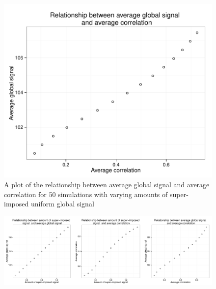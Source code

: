 \documentclass[a4paper]{article}\usepackage[]{graphicx}\usepackage[]{color}
\makeatletter
\def\maxwidth{ %
  \ifdim\Gin@nat@width>\linewidth
    \linewidth
  \else
    \Gin@nat@width
  \fi
}
\newenvironment{knitrout}{}{} %
\makeatother
\begin{document}
\begin{knitrout}
\color{fgcolor}\begin{figure}[]


{\centering \includegraphics[width=\maxwidth]{GSFigs/GSavgGSavgCOR} 

}

\caption[A plot of the relationship between average global signal and average correlation for 50 simulations with varying amounts of super-imposed uniform global signal]{A plot of the relationship between average global signal and average correlation for 50 simulations with varying amounts of super-imposed uniform global signal\label{fig:avgGSavgCOR}}
\end{figure}


\end{knitrout}




\begin{knitrout}
\color{fgcolor}\begin{figure}[]


{\centering \includegraphics[width=\maxwidth]{GSFigs/GSGSCorandAmount} 

}

\caption[]{\label{fig:GSCorandAmount}}
\end{figure}


\end{knitrout}
\end{document}
